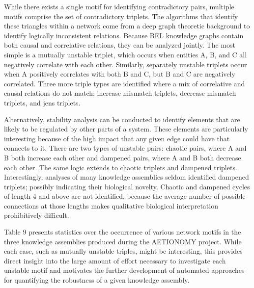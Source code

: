 While there exists a single motif for identifying contradictory pairs, multiple motifs comprise the set of contradictory triplets. The algorithms that identify these triangles within a network come from a deep graph theoretic background to identify logically inconsistent relations. Because BEL knowledge graphs contain both causal and correlative relations, they can be analyzed jointly. The most simple is a mutually unstable triplet, which occurs when entities A, B, and C all negatively correlate with each other. Similarly, separately unstable triplets occur when A positively correlates with both B and C, but B and C are negatively correlated. Three more triple types are identified where a mix of  correlative and causal relations do not match: increase mismatch triplets, decrease mismatch triplets, and jens triplets.

Alternatively, stability analysis can be conducted to identify elements that are likely to be regulated by other parts of a system. These elements are particularly interesting because of the high impact that any given edge could have that connects to it. There are two types of unstable pairs: chaotic pairs, where A and B both increase each other and dampened pairs, where A and B both decrease each other. The same logic extends to chaotic triplets and dampened triplets. Interestingly, analyses of many knowledge assemblies seldom identified dampened triplets; possibly indicating their biological novelty. Chaotic and dampened cycles of length 4 and above are not identified, because the average number of possible connections at those lengths makes qualitative biological interpretation prohibitively difficult. 

Table 9 presents statistics over the occurrence of various network motifs in the three knowledge assemblies produced during the AETIONOMY project. While each case, such as mutually unstable triples, might be interesting, this provides direct insight into the large amount of effort necessary to investigate each unstable motif and motivates the further development of automated approaches for quantifying the robustness of a given knowledge assembly.

